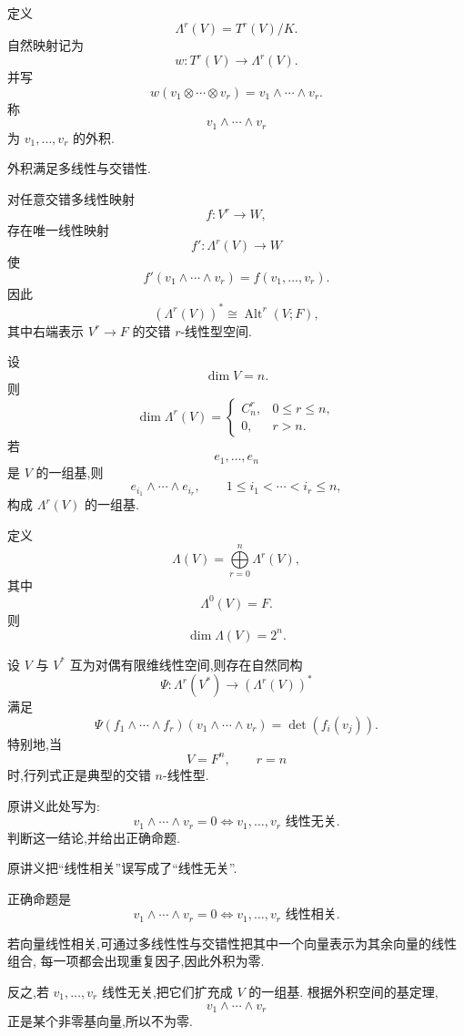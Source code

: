 \begin{definition}[外积空间]
定义
\[
\Lambda^r(V)=T^r(V)/K.
\]
自然映射记为
\[
w:T^r(V)\to\Lambda^r(V).
\]
并写
\[
w(v_1\otimes\cdots\otimes v_r)
=
v_1\wedge\cdots\wedge v_r.
\]
称
\[
v_1\wedge\cdots\wedge v_r
\]
为 $v_1,\ldots,v_r$ 的外积.
\end{definition}


\begin{lemma}[\markstar]
外积满足多线性与交错性.
\end{lemma}


\begin{theorem}
对任意交错多线性映射
\[
f:V^r\to W,
\]
存在唯一线性映射
\[
f':\Lambda^r(V)\to W
\]
使
\[
f'(v_1\wedge\cdots\wedge v_r)
=
f(v_1,\ldots,v_r).
\]
因此
\[
(\Lambda^r(V))^*
\cong
\operatorname{Alt}^r(V;F),
\]
其中右端表示 $V^r\to F$ 的交错 $r$-线性型空间.
\end{theorem}


\begin{theorem}[\markstar]
设
\[
\dim V=n.
\]
则
\[
\dim\Lambda^r(V)
=
\begin{cases}
C_{n}^{r}, & 0\le r\le n,\\
0, & r>n.
\end{cases}
\]
若
\[
e_1,\ldots,e_n
\]
是 $V$ 的一组基,则
\[
e_{i_1}\wedge\cdots\wedge e_{i_r},
\qquad
1\le i_1<\cdots<i_r\le n,
\]
构成 $\Lambda^r(V)$ 的一组基.

定义
\[
\Lambda(V)
=
\bigoplus\limits_{r=0}^{n}\Lambda^r(V),
\]
其中
\[
\Lambda^0(V)=F.
\]
则
\[
\boxed{\dim\Lambda(V)=2^n}.
\]
\end{theorem}


\begin{theorem}[\markstar]
设 $V$ 与 $V^*$ 互为对偶有限维线性空间,则存在自然同构
\[
\Psi:
\Lambda^r(V^*)
\longrightarrow
(\Lambda^r(V))^*
\]
满足
\[
\Psi(f_1\wedge\cdots\wedge f_r)
(v_1\wedge\cdots\wedge v_r)
=
\det(f_i(v_j)).
\]
特别地,当
\[
V=F^n,\qquad r=n
\]
时,行列式正是典型的交错 $n$-线性型.
\end{theorem}


\begin{example}
原讲义此处写为:
\[
v_1\wedge\cdots\wedge v_r=0
\iff
v_1,\ldots,v_r\text{ 线性无关}.
\]
判断这一结论,并给出正确命题.
\end{example}
\exampleblank

\begin{solution}
原讲义把``线性相关''误写成了``线性无关''.

正确命题是
\[
\boxed{
v_1\wedge\cdots\wedge v_r=0
\iff
v_1,\ldots,v_r\text{ 线性相关}.
}
\]

若向量线性相关,可通过多线性性与交错性把其中一个向量表示为其余向量的线性组合,
每一项都会出现重复因子,因此外积为零.

反之,若 $v_1,\ldots,v_r$ 线性无关,把它们扩充成 $V$ 的一组基.
根据外积空间的基定理,
\[
v_1\wedge\cdots\wedge v_r
\]
正是某个非零基向量,所以不为零.
\end{solution}


